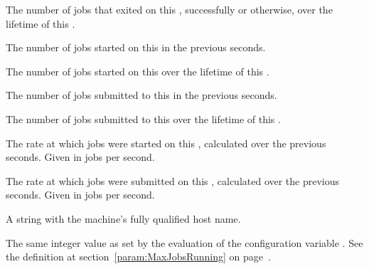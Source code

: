 \begin{description}
\item[\AdAttr{JobsExitedCumulative}:] The number of jobs that exited
  on this , successfully or otherwise, over
  the lifetime of this .

\item[\AdAttr{JobsStarted}:] The number of jobs started on this
   in the previous  seconds.

\item[\AdAttr{JobsStartedCumulative}:] The number of jobs started on this
   over the lifetime of this .

\item[\AdAttr{JobsSubmitted}:] The number of jobs submitted to
  this  in the previous  seconds.

\item[\AdAttr{JobsSubmittedCumulative}:] The number of jobs submitted to
  this  over the lifetime of this .

\item[\AdAttr{JobStartRate}:] The rate at which jobs were started
  on this , 
  calculated over the previous  seconds.
  Given in jobs per second.

\item[\AdAttr{JobSubmissionRate}:] The rate at which jobs were
  submitted on this , 
  calculated over the previous  seconds.
  Given in jobs per second.

\item[\AdAttr{Machine}:] A string with the machine's fully qualified 
  host name.

\item[\AdAttr{MaxJobsRunning}:] The same integer value as set by the
  evaluation of the configuration variable .
  See the definition at section~\ref{param:MaxJobsRunning} on
  page~\pageref{param:MaxJobsRunning}.


\end{description}

